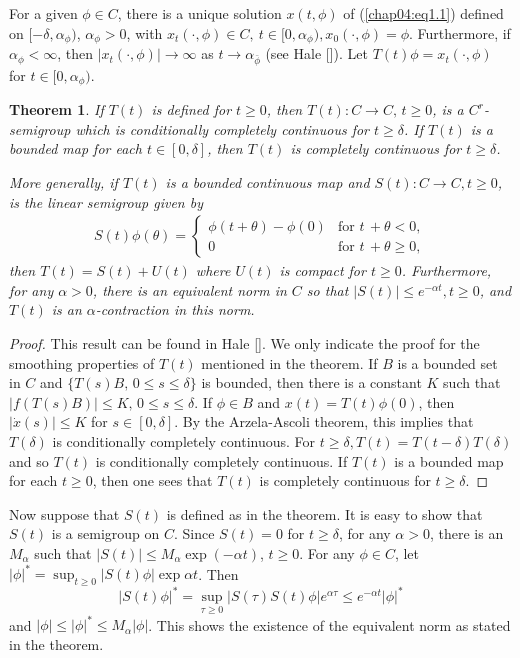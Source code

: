 \documentclass{surv-l}
\theoremstyle{plain}
\newtheorem{theorem}{Theorem}[section]
\theoremstyle{definition}
\numberwithin{equation}{section}
\numberwithin{figure}{chapter}
\begin{document}
For a given $\phi \in C$, there is a unique solution $x(t, \phi)$ of (\ref{chap04:eq1.1}) defined on $[-\delta, \alpha_{\phi})$, $\alpha_{\phi}>0$, with $x_{t}(\cdot, \phi)\in C,\ t\in[0,\alpha_{\phi}), x_{0}(\cdot, \phi)=\phi$. Furthermore, if $\alpha_{\phi}<\infty$, then $|x_{t}(\cdot, \phi)|\rightarrow\infty$ as $t\rightarrow\alpha_{\bar{\phi}}$ (see Hale [\citeyear{1977h}]). Let $T(t)\phi=x_{t}(\cdot, \phi)$ for $t\in[0, \alpha_{\phi})$.

\begin{theorem}\label{thm4.1.1}
If $T(t)$ is defined for $t\geq 0$, then $T(t)\!:C\rightarrow C,\,t\geq 0$, is a $C^{r}$-semigroup which is conditionally completely continuous for $ t\geq\delta$. If $T(t)$ is a bounded map for each $t\in[0, \delta]$, then $T(t)$ is completely continuous for $ t\geq\delta$.

More generally, if $T(t)$ is a bounded continuous map and $S(t)\!:C\rightarrow C,t\geq 0$, is the linear semigroup given by
\begin{align*}
S(t)\phi(\theta)=\left\{\begin{array}{ll}
\phi(t+\theta)-\phi(0) & \text{for } t\,+\theta<0,\\
0 & \text{for } t\,+\theta\geq 0,
\end{array}\right.
\end{align*}
then $T(t)=S(t)+U(t)$ where $U(t)$ is compact for $t\geq 0$. Furthermore, for any $\alpha>0$, there is an equivalent norm in $C$ so that $|S(t)|\leq e^{-\alpha t},t\geq 0$, and $T(t)$ is an $\alpha$-contraction in this norm.
\end{theorem}

\begin{proof}
This result can be found in Hale [\citeyear{1977h}]. We only indicate the proof for the smoothing properties of $T(t)$ mentioned in the theorem. If $B$ is a bounded set in $C$ and $\{T(s)B,\, 0\leq s\leq\delta\}$ is bounded, then there is a constant $K$ such that $|f(T(s)B)|\leq K,\, 0\leq s\leq\delta$. If $\phi \in B$ and $x(t)=T(t)\phi(0)$, then $|\dot{x}(s)|\leq K$ for $s\in[0, \delta]$. By the Arzela-Ascoli theorem, this implies that $T(\delta)$ is conditionally completely continuous. For $ t\geq\delta, T(t)=T(t-\delta)T(\delta)$ and so $T(t)$ is conditionally completely continuous. If $T(t)$ is a bounded map for each $t\geq 0$, then one sees that $T(t)$ is completely continuous for $ t\geq\delta$.

\end{proof}

Now suppose that $S(t)$ is defined as in the theorem. It is easy to show that $S(t)$ is a semigroup on $C$. Since $S(t)=0$ for $ t\geq\delta$, for any $\alpha>0$, there is an $M_{\alpha}$ such that $|S(t)|\leq M_{\alpha}\exp(-\alpha t)$, $t\geq 0$. For any $\phi \in C$, let $|\phi|^{\ast}= \sup_{t\geq 0}|S(t)\phi|\exp\alpha t$. Then
\begin{equation*}
|S(t)\phi|^{\ast}=\sup_{\tau\geq 0}|S(\tau)S(t)\phi|e^{\alpha\tau}\leq e^{-\alpha t}|\phi|^{\ast}
\end{equation*}
and $|\phi|\leq|\phi|^{\ast}\leq M_{\alpha}|\phi|$. This shows the existence of the equivalent norm as stated in the theorem.
\end{document}
